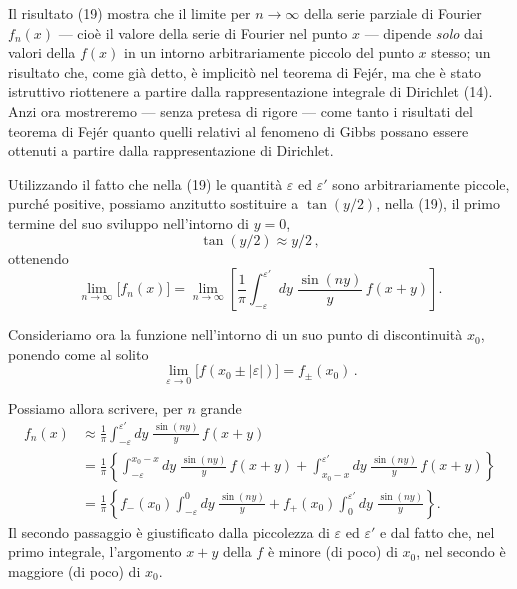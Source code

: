 \documentclass[11pt, a4paper]{book}
\numberwithin{equation}{section}
\begin{document}
Il risultato (19) mostra che il limite per $n\to\infty$ della serie parziale di Fourier $f_n(x)$ --- cioè il valore della serie di Fourier nel punto $x$ --- dipende \emph{solo} dai valori della $f(x)$ in un intorno arbitrariamente piccolo del punto $x$ stesso; un risultato che, come già detto, è implicitò nel teorema di Fejér, ma che è stato istruttivo riottenere a partire dalla rappresentazione integrale di Dirichlet (14). Anzi ora mostreremo --- senza pretesa di rigore --- come tanto i risultati del teorema di Fejér quanto quelli relativi al fenomeno di Gibbs possano essere ottenuti a partire dalla rappresentazione di Dirichlet.

Utilizzando il fatto che nella (19) le quantità $\varepsilon$ ed $\varepsilon'$ sono arbitrariamente piccole, purché positive, possiamo anzitutto sostituire a $\tan(y/2)$, nella (19), il primo termine del suo sviluppo nell'intorno di $y=0$,
\begin{equation}
  \tan(y/2) \approx y/2\,, \tag{20}
\end{equation}
ottenendo
\begin{equation}
  \lim_{n\to\infty}\bigl[f_n(x)\bigr]
  = \lim_{n\to\infty}\left[\frac{1}{\pi}\int_{-\varepsilon}^{\varepsilon'} dy\;
  \frac{\sin(ny)}{y}\,f(x+y)\right]. \tag{21}
\end{equation}

Consideriamo ora la funzione nell'intorno di un suo punto di discontinuità $x_0$, ponendo come al solito
\begin{equation}
  \lim_{\varepsilon\to 0}\bigl[f(x_0\pm|\varepsilon|)\bigr] = f_\pm(x_0)\,. \tag{22}
\end{equation}

Possiamo allora scrivere, per $n$ grande
\begin{align}
  f_n(x) &\approx \frac{1}{\pi}\int_{-\varepsilon}^{\varepsilon'} dy\;\frac{\sin(ny)}{y}\,f(x+y) \tag{23a}\\
  &= \frac{1}{\pi}\left\{\int_{-\varepsilon}^{x_0-x} dy\;\frac{\sin(ny)}{y}\,f(x+y)
    + \int_{x_0-x}^{\varepsilon'} dy\;\frac{\sin(ny)}{y}\,f(x+y)\right\} \tag{23b}\\
  &= \frac{1}{\pi}\left\{f_-(x_0)\int_{-\varepsilon}^{0} dy\;\frac{\sin(ny)}{y}
    + f_+(x_0)\int_{0}^{\varepsilon'} dy\;\frac{\sin(ny)}{y}\right\}. \tag{23c}
\end{align}
Il secondo passaggio è giustificato dalla piccolezza di $\varepsilon$ ed $\varepsilon'$ e dal fatto che, nel primo integrale, l'argomento $x+y$ della $f$ è minore (di poco) di $x_0$, nel secondo è maggiore (di poco) di $x_0$.
\end{document}
